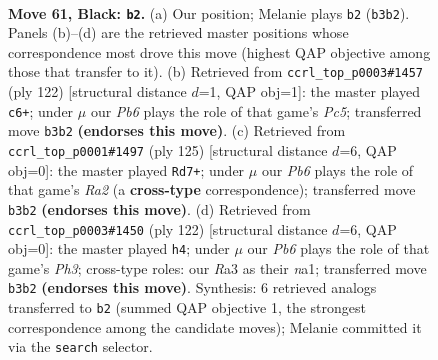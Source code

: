 \documentclass[11pt]{article}
\begin{document}
\clearpage

\begin{figure}[p]\centering
\begin{subfigure}{0.46\textwidth}\centering
\resizebox{\linewidth}{!}{%
\newchessgame
\chessboard[
  setfen={6K1/8/8/7k/8/rp6/8/8 b - - 1 61},
  showmover=false,
  pgfstyle=straightmove, color=movearrow, markmove={b3-b2}
]}
\caption{}
\end{subfigure}\hfill
\begin{subfigure}{0.46\textwidth}\centering
\resizebox{\linewidth}{!}{%
\newchessgame
\chessboard[
  setfen={8/1k6/8/2P2R2/8/8/6K1/8 w - - 1 62},
  showmover=false,
  pgfstyle=straightmove, color=movearrow, markmove={c5-c6}
]}
\caption{}
\end{subfigure}
\\[4pt]
\begin{subfigure}{0.46\textwidth}\centering
\resizebox{\linewidth}{!}{%
\newchessgame
\chessboard[
  setfen={1R6/r7/8/8/6k1/8/3K4/8 b - - 6 63},
  showmover=false,
  pgfstyle=straightmove, color=movearrow, markmove={a7-d7}
]}
\caption{}
\end{subfigure}\hfill
\begin{subfigure}{0.46\textwidth}\centering
\resizebox{\linewidth}{!}{%
\newchessgame
\chessboard[
  setfen={8/1k6/8/6K1/8/7P/8/n7 w - - 3 62},
  showmover=false,
  pgfstyle=straightmove, color=movearrow, markmove={h3-h4}
]}
\caption{}
\end{subfigure}
\caption{\textbf{Move 61, Black: \texttt{b2}.} (a) Our position; Melanie plays \texttt{b2} (\texttt{b3b2}). Panels (b)--(d) are the retrieved master positions whose correspondence most drove this move (highest QAP objective among those that transfer to it). (b) Retrieved from \texttt{ccrl\_top\_p0003\#1457} (ply 122) [structural distance $d$=1, QAP obj=1]: the master played \texttt{c6+}; under $\mu$ our \emph{Pb6} plays the role of that game's \emph{Pc5}; transferred move \texttt{b3b2} \textbf{(endorses this move)}. (c) Retrieved from \texttt{ccrl\_top\_p0001\#1497} (ply 125) [structural distance $d$=6, QAP obj=0]: the master played \texttt{Rd7+}; under $\mu$ our \emph{Pb6} plays the role of that game's \emph{Ra2} (a \textbf{cross-type} correspondence); transferred move \texttt{b3b2} \textbf{(endorses this move)}. (d) Retrieved from \texttt{ccrl\_top\_p0003\#1450} (ply 122) [structural distance $d$=6, QAP obj=0]: the master played \texttt{h4}; under $\mu$ our \emph{Pb6} plays the role of that game's \emph{Ph3}; cross-type roles: our \emph{R}a3 as their \emph{n}a1; transferred move \texttt{b3b2} \textbf{(endorses this move)}. Synthesis: 6 retrieved analogs transferred to \texttt{b2} (summed QAP objective 1, the strongest correspondence among the candidate moves); Melanie committed it via the \texttt{search} selector.}
\label{fig:thought-m121}
\end{figure}
\end{document}
